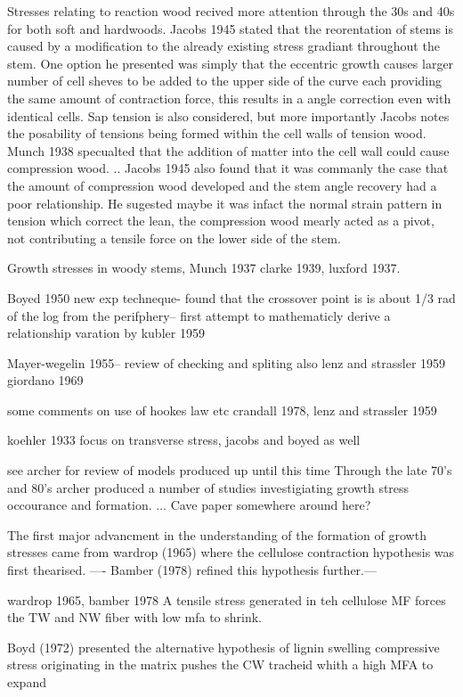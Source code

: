 \documentclass{article}
\begin{document}
Stresses relating to reaction wood recived more attention through the 30s and
40s for both soft and hardwoods. Jacobs 1945 stated that the reorentation of
stems is caused by a modification to the already existing stress gradiant
throughout the stem. One option he presented was simply that the eccentric
growth causes larger number of cell sheves to be added to the upper side of the
curve each providing the same amount of contraction force, this results in a
angle correction even with identical cells. Sap tension is also considered, but
more importantly Jacobs notes the posability of tensions being formed within the
cell walls of tension wood.
Munch 1938 specualted that the addition of matter into the cell wall could cause
compression wood. ..
Jacobs 1945 also found that it was commanly the case that the amount of
compression wood developed and the stem angle recovery had a poor relationship.
He sugested maybe it was infact the normal strain pattern in tension which
correct the lean, the compression wood mearly acted as a pivot, not contributing
a tensile force on the lower side of the stem.

Growth stresses in woody stems, Munch
1937 clarke 1939, luxford 1937.

Boyed 1950 new exp techneque- found that the crossover point is is about 1/3 rad
of the log from the perifphery-- first attempt to mathematicly derive a
relationship
varation by kubler 1959

Mayer-wegelin 1955-- review of checking and spliting also lenz and strassler
1959 giordano 1969

some comments on use of hookes law etc crandall 1978, lenz and strassler 1959

koehler 1933 focus on transverse stress, jacobs and boyed as well

see archer for review of models produced up until this time
Through the late 70's and 80's archer produced a number of studies
investigiating growth stress occourance and formation. ...
Cave paper somewhere around here?

The first major advancment in the understanding of the formation of growth
stresses came from wardrop (1965) where the cellulose contraction hypothesis was
first thearised. ---- Bamber (1978) refined this hypothesis further.---

wardrop 1965, bamber 1978 A tensile stress generated in teh cellulose MF forces
the TW and NW fiber with low mfa to shrink.

Boyd (1972) presented the alternative hypothesis of lignin swelling
compressive stress originating in the matrix pushes the CW
tracheid whith a high MFA to expand
\end{document}
